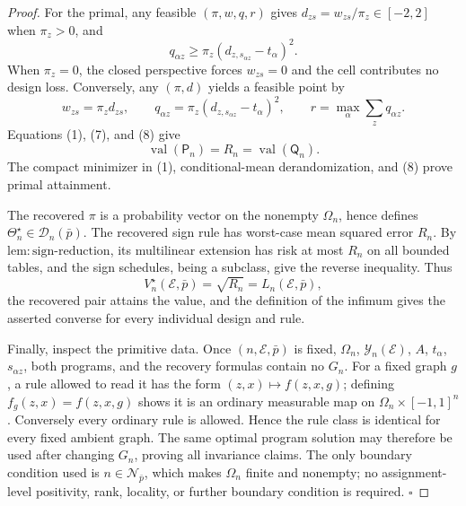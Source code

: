 \documentclass{article}
\begin{document}
\begin{proof}
For the primal, any feasible \((\pi,w,q,r)\) gives \(d_{zs}=w_{zs}/\pi_z\in[-2,2]\) when \(\pi_z>0\), and
\[
 q_{\alpha z}\ge\pi_z(d_{z,s_{\alpha z}}-t_\alpha)^2. \tag{7}
\]
When \(\pi_z=0\), the closed perspective forces \(w_{zs}=0\) and the cell contributes no design loss. Conversely, any \((\pi,d)\) yields a feasible point by
\[
 w_{zs}=\pi_zd_{zs},\qquad
 q_{\alpha z}=\pi_z(d_{z,s_{\alpha z}}-t_\alpha)^2,
 \qquad
 r=\max_\alpha\sum_zq_{\alpha z}. \tag{8}
\]
Equations (1), (7), and (8) give
\[
 \operatorname{val}(\mathsf P_n)=R_n=\operatorname{val}(\mathsf Q_n). \tag{9}
\]
The compact minimizer in (1), conditional-mean derandomization, and (8) prove primal attainment.

The recovered \(\pi\) is a probability vector on the nonempty \(\Omega_n\), hence defines \(\Theta_n^\star\in\mathcal D_n(\bar p)\). The recovered sign rule has worst-case mean squared error \(R_n\). By \(\mathrm{lem{:}sign\text{-}reduction}\), its multilinear extension has risk at most \(R_n\) on all bounded tables, and the sign schedules, being a subclass, give the reverse inequality. Thus
\[
 V_n^\star(\mathcal E,\bar p)=\sqrt{R_n}
 =L_n(\mathcal E,\bar p),
\]
the recovered pair attains the value, and the definition of the infimum gives the asserted converse for every individual design and rule.

Finally, inspect the primitive data. Once \((n,\mathcal E,\bar p)\) is fixed, \(\Omega_n\), \(\mathcal Y_n(\mathcal E)\), \(A\), \(t_\alpha\), \(s_{\alpha z}\), both programs, and the recovery formulas contain no \(G_n\). For a fixed graph \(g\), a rule allowed to read it has the form \((z,x)\mapsto f(z,x,g)\); defining \(f_g(z,x)=f(z,x,g)\) shows it is an ordinary measurable map on \(\Omega_n\times[-1,1]^n\). Conversely every ordinary rule is allowed. Hence the rule class is identical for every fixed ambient graph. The same optimal program solution may therefore be used after changing \(G_n\), proving all invariance claims. The only boundary condition used is \(n\in\mathcal N_{\bar p}\), which makes \(\Omega_n\) finite and nonempty; no assignment-level positivity, rank, locality, or further boundary condition is required. \(\square\)
\end{proof}
\end{document}
